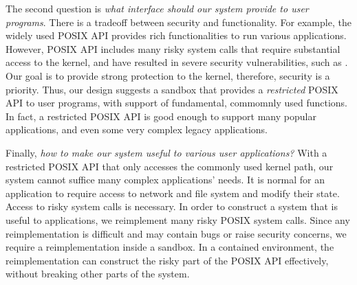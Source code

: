 The second question is \textit{what interface should our system provide to user programs}. 
There is a tradeoff between security and functionality. For example, 
the widely used POSIX API provides rich functionalities to run various 
applications. However, POSIX API includes many risky system calls 
that require substantial access to the kernel, and have resulted in 
severe security vulnerabilities, such as .
Our goal is to provide strong protection to the kernel, therefore, 
security is a priority. 
Thus, our design suggests a sandbox that provides a \textit{restricted} POSIX API to user programs, with 
support of fundamental, commomnly used functions. In fact, a restricted POSIX API is good enough to support many popular applications, 
and even some very complex legacy applications. 

Finally, \textit{how to make our system useful to various user applications?} 
With a restricted POSIX API that only accesses the commonly 
used kernel path, our system cannot suffice many complex 
applications' needs. It is normal for an application to require access
to network and file system and modify their state. Access to risky 
system calls is necessary. In order to construct a system that is 
useful to applications, we reimplement many risky POSIX system calls. Since 
any reimplementation is difficult and may contain bugs or raise 
security concerns, we require a reimplementation inside a sandbox. 
In a contained environment, the reimplementation can construct the risky part of
the POSIX API effectively, without breaking other parts of the system.  


